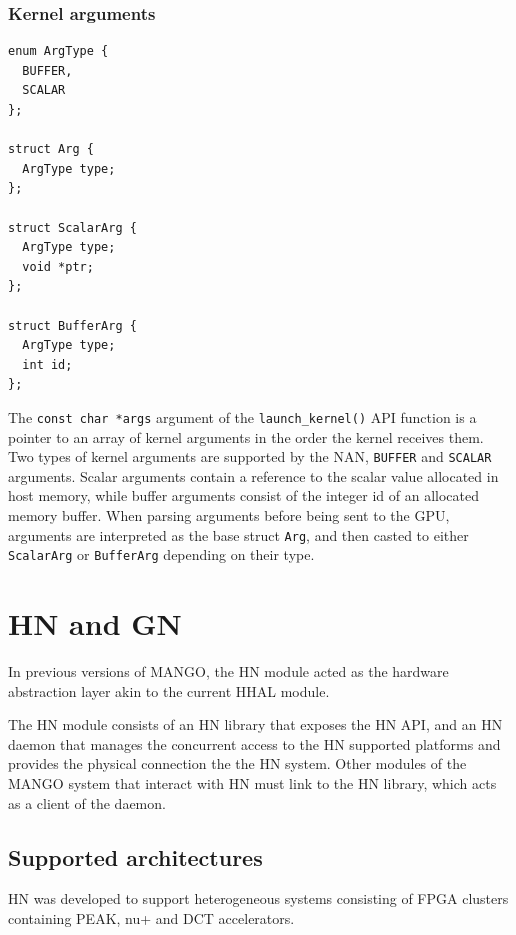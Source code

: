 \subsubsection{Kernel arguments}

\begin{lstlisting}[style=CStyle, label=NAN:ResourceArguments, caption=Nvidia Architecture Manager - Kernel arguments]
enum ArgType {
  BUFFER,
  SCALAR
};

struct Arg {
  ArgType type;
};

struct ScalarArg {
  ArgType type;
  void *ptr;
};

struct BufferArg {
  ArgType type;
  int id;
};
\end{lstlisting}

The \texttt{const char *args} argument of the \texttt{launch\_kernel()} API function is a pointer to an array of kernel arguments in the order the kernel receives them. Two types of kernel arguments are supported by the NAN, \texttt{BUFFER} and \texttt{SCALAR} arguments. Scalar arguments contain a reference to the scalar value allocated in host memory, while buffer arguments consist of the integer id of an allocated memory buffer. When parsing arguments before being sent to the GPU, arguments are interpreted as the base struct \texttt{Arg}, and then casted to either \texttt{ScalarArg} or \texttt{BufferArg} depending on their type.


\section{HN and GN}

In previous versions of MANGO, the HN module acted as the hardware abstraction layer akin to the current HHAL module.

The HN module consists of an HN library that exposes the HN API, and an HN daemon that manages the concurrent access to the HN supported platforms and provides the physical connection the the HN system. Other modules of the MANGO system that interact with HN must link to the HN library, which acts as a client of the daemon.

\subsection{Supported architectures}

HN was developed to support heterogeneous systems consisting of FPGA clusters containing PEAK, nu+ and DCT accelerators.

